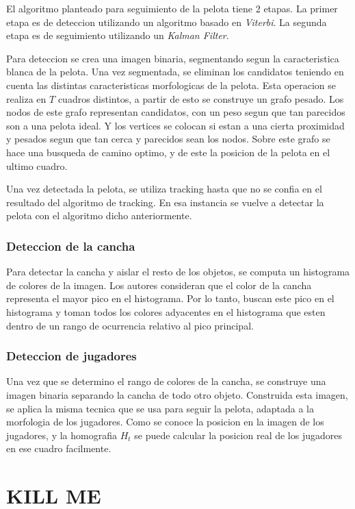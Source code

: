 \documentclass[a4paper,10pt]{article}
\begin{document}
El algoritmo planteado para seguimiento de la pelota tiene 2 etapas.
La primer etapa es de deteccion utilizando un algoritmo basado en \textit{Viterbi}.
La segunda etapa es de seguimiento utilizando un \textit{Kalman Filter}.

Para deteccion se crea una imagen binaria, segmentando segun la caracteristica blanca de la pelota.
Una vez segmentada, se eliminan los candidatos teniendo en cuenta las distintas caracteristicas morfologicas de la pelota. 
Esta operacion se realiza en $T$ cuadros distintos, a partir de esto se construye un grafo pesado.
Los nodos de este grafo representan candidatos, con un peso segun que tan parecidos son a una pelota ideal.
Y los vertices se colocan si estan a una cierta proximidad y pesados segun que tan cerca y parecidos sean los nodos.
Sobre este grafo se hace una busqueda de camino optimo, y de este la posicion de la pelota en el ultimo cuadro.

Una vez detectada la pelota, se utiliza tracking hasta que no se confia en el resultado del algoritmo de tracking.
En esa instancia se vuelve a detectar la pelota con el algoritmo dicho anteriormente.

\subsubsection*{Deteccion de la cancha}

Para detectar la cancha y aislar el resto de los objetos, se computa un histograma de colores de la imagen.
Los autores consideran que el color de la cancha representa el mayor pico en el histograma.
Por lo tanto, buscan este pico en el histograma y toman todos los colores adyacentes en el histograma que esten dentro de un rango de ocurrencia relativo al pico principal.

\subsubsection*{Deteccion de jugadores}

Una vez que se determino el rango de colores de la cancha, se construye una imagen binaria separando la cancha de todo otro objeto.
Construida esta imagen, se aplica la misma tecnica que se usa para seguir la pelota, adaptada a la morfologia de los jugadores.
Como se conoce la posicion en la imagen de los jugadores, y la homografia $H_t$ se puede calcular la posicion real de los jugadores en ese cuadro facilmente.


\section{KILL ME}
\end{document}
